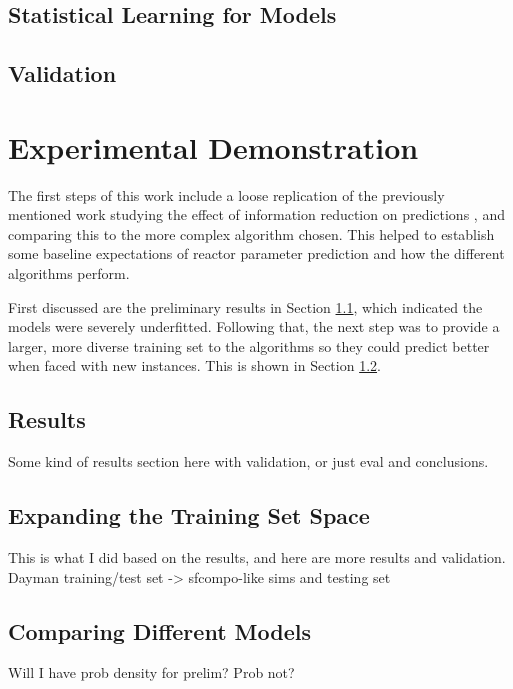\subsection{Statistical Learning for Models}
\label{sec:statmodel}


\subsection{Validation}
\label{sec:valid}


\section{Experimental Demonstration}
\label{sec:expdemo}

The first steps of this work include a loose replication of the previously
mentioned work studying the effect of information reduction on predictions
\cite{dayman_feasibility_2013}, and comparing this to the more complex algorithm chosen.
This helped to establish some baseline expectations of reactor
parameter prediction and how the different algorithms perform. 

First discussed are the preliminary results in Section \ref{sec:results}, which
indicated the models were severely underfitted. Following that, the next step
was to provide a larger, more diverse training set to the algorithms so they
could predict better when faced with new instances. This is shown in Section
\ref{sec:newtrain}. 


\subsection{Results}
\label{sec:results}

Some kind of results section here with validation, or just eval and conclusions.

\subsection{Expanding the Training Set Space}
\label{sec:newtrain}

This is what I did based on the results, and here are more results and validation.
Dayman training/test set -> sfcompo-like sims and testing set

\subsection{Comparing Different Models}
\label{sec:compare}

Will I have prob density for prelim? Prob not?
